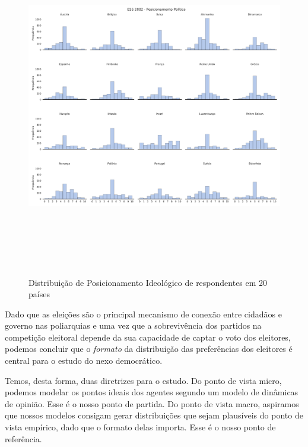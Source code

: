 \begin{figure}[H]
  \centering \includegraphics[width= \textwidth, height = 15cm]{ims/ess_2002_plots.pdf}
  \caption{Distribuição de Posicionamento Ideológico de respondentes em 20 países}
\end{figure}

Dado que as eleições são o principal mecanismo de conexão entre cidadãos e
governo nas poliarquias \cite{dahl1989democracy} e uma vez que a sobrevivência
dos partidos na competição eleitoral depende da sua capacidade de captar o voto
dos eleitores, podemos concluir que o \textit{formato} da distribuição das
preferências dos eleitores é central para o estudo do nexo democrático.

Temos, desta forma, duas diretrizes para o estudo. Do ponto de vista micro,
podemos modelar os pontos ideais dos agentes segundo um modelo de dinâmicas de
opinião. Esse é o nosso ponto de partida. Do ponto de vista macro, aspiramos que
nossos modelos consigam gerar distribuições que sejam plausíveis do ponto de
vista empírico, dado que o formato delas importa. Esse é o nosso ponto de
referência.





